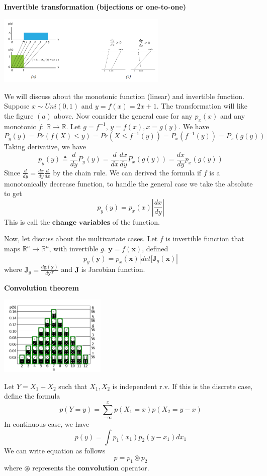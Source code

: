 \documentclass[10pt,landscape]{article}
\newcommand{\inp}{\textbf{x}}
\newcommand{\out}{\textbf{y}}
\newcommand{\R}{\mathbb{R}}
\begin{document}
\begin{multicols*}{3}
\textbf{Invertible transformation (bijections or one-to-one)}
\begin{minipage}{\linewidth}
    \centering
    \includegraphics[width=3.2in]{figures/bijection.PNG}
\end{minipage}
We will discuss about the monotonic function (linear) and invertible function. Suppose $x\sim Uni(0,1)$ and $y=f(x)=2x+1$. The transformation will like the figure $(a)$ above.
Now consider the general case for any $p_x(x)$ and any monotonic $f$: $\R\rightarrow\R$. Let $g=f^{-1}$, $y=f(x),x=g(y)$. We have
\[
    P_y(y)=Pr(f(X)\leq y)=Pr(X\leq f^{-1}(y))=P_x(f^{-1}(y))=P_x(g(y))
\]
Taking derivative, we have
\[
    p_y(y) \triangleq  \frac{d}{dy}P_y(y)=\frac{d}{dx}\frac{dx}{dy}P_x(g(y))=\frac{dx}{dy}p_x(g(y))
\]
Since \(\frac{d}{dy}=\frac{dx}{dy}\frac{d}{dx}\) by the chain rule. We can derived the formula if $f$ is a monotonically decrease function, to handle the general case we take the absolute to get
\[
    p_y(y)=p_x(x)|\frac{dx}{dy}|
\]
This is call the $\textbf{change variables}$ of the function.

Now, let discuss about the multivariate cases. Let $f$ is invertible function that maps $\R^n\rightarrow\R^n$, with invertible $g$. $\out=f(\inp)$, defined
\[
    p_y(\out)=p_x(\inp)|det[\mathbf{J}_g(\inp)|
\]
where $\mathbf{J}_g=\frac{d\mathbf{g(y)}}{d\mathbf{y^T}}$ and $\mathbf J$ is Jacobian function.

\textbf{Convolution theorem}

\begin{minipage}{\linewidth}
    \centering
    \includegraphics[width=2in]{figures/convolution.PNG}
\end{minipage}

Let $Y=X_1+X_2$ such that $X_1,X_2$ is independent r.v. If this is the discrete case, define the formula
\[
    p(Y=y)=\sum_{-\infty}^{x}p(X_1=x)p(X_2=y-x)
\]
In continuous case, we have
\[
    p(y)=\int p_1(x_1)p_2(y-x_1)dx_1
\]
We can write equation as follows
\[
    p = p_1 \circledast p_2
\]
where $\circledast$ represents the $\textbf{convolution}$ operator.


\end{multicols*}
\end{document}

